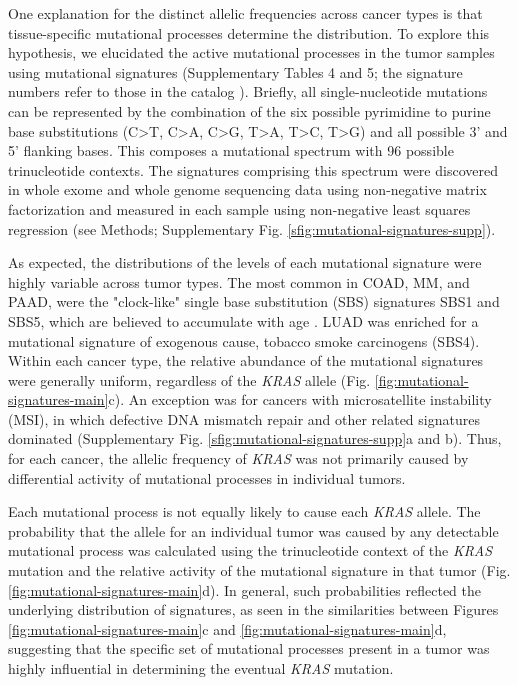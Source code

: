 \documentclass[english, 10pt, letterpaper]{article}
\newcommand{\KRAS}{\emph{KRAS}}
\begin{document}
One explanation for the distinct allelic frequencies across cancer types is that tissue-specific mutational processes determine the distribution.
To explore this hypothesis, we elucidated the active mutational processes in the tumor samples using mutational signatures \cite{Alexandrov2013} (Supplementary Tables 4 and 5; the signature numbers refer to those in the catalog \cite{Alexandrov2020TheCancer.}). 
Briefly, all single-nucleotide mutations can be represented by the combination of the six possible pyrimidine to purine base substitutions (C>T, C>A, C>G, T>A, T>C, T>G) and all possible 3’ and 5’ flanking bases. 
This composes a mutational spectrum with 96 possible trinucleotide contexts. 
The signatures comprising this spectrum were discovered in whole exome and whole genome sequencing data using non-negative matrix factorization and measured in each sample using non-negative least squares regression (see Methods; Supplementary Fig. \ref{sfig:mutational-signatures-supp}).

As expected, the distributions of the levels of each mutational signature were highly variable across tumor types.
The most common in COAD, MM, and PAAD, were the "clock-like" single base substitution (SBS) signatures SBS1 and SBS5, which are believed to accumulate with age \cite{Alexandrov2015}. 
LUAD was enriched for a mutational signature of exogenous cause, tobacco smoke carcinogens (SBS4). 
Within each cancer type, the relative abundance of the mutational signatures were generally uniform, regardless of the \KRAS{} allele (Fig. \ref{fig:mutational-signatures-main}c). 
An exception was for cancers with microsatellite instability (MSI), in which defective DNA mismatch repair and other related signatures dominated (Supplementary Fig. \ref{sfig:mutational-signatures-supp}a and b).
Thus, for each cancer, the allelic frequency of \KRAS{} was not primarily caused by differential activity of mutational processes in individual tumors.

Each mutational process is not equally likely to cause each \KRAS{} allele.
The probability that the allele for an individual tumor was caused by any detectable mutational process was calculated using the trinucleotide context of the \KRAS{} mutation and the relative activity of the mutational signature in that tumor (Fig. \ref{fig:mutational-signatures-main}d).
In general, such probabilities reflected the underlying distribution of signatures, as seen in the similarities between Figures \ref{fig:mutational-signatures-main}c and \ref{fig:mutational-signatures-main}d, suggesting that the specific set of mutational processes present in a tumor was highly influential in determining the eventual \KRAS{} mutation.
\end{document}
